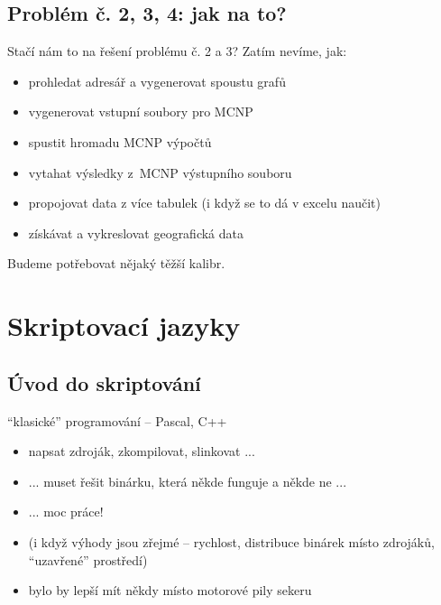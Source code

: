 \documentclass{beamer}
\begin{document}
\subsection{Problém č. 2, 3, 4: jak na to?}

\begin{frame}{Stačí nám to na řešení problému č. 2 a 3?}
  Zatím nevíme, jak:
  \begin{itemize}
    \item prohledat adresář a vygenerovat spoustu grafů
  \end{itemize}
  \begin{itemize}
    \item vygenerovat vstupní soubory pro MCNP
    \item spustit hromadu MCNP výpočtů
    \item vytahat výsledky z~MCNP výstupního souboru
  \end{itemize}
  \begin{itemize}
    \item propojovat data z více tabulek (i když se to dá v excelu naučit)
    \item získávat a vykreslovat geografická data
  \end{itemize}
  Budeme potřebovat nějaký těžší kalibr.
\end{frame}

\section{Skriptovací jazyky}

\subsection{Úvod do skriptování}

\begin{frame}{``klasické'' programování -- Pascal, C++}
  \begin{itemize}
    \item napsat zdroják, zkompilovat, slinkovat ...
    \item ... muset řešit binárku, která někde funguje a někde ne ...
    \item ... moc práce!
    \item (i když výhody jsou zřejmé -- rychlost, distribuce binárek místo zdrojáků, ``uzavřené'' prostředí)
    \item bylo by lepší mít někdy místo motorové pily sekeru
  \end{itemize}
\end{frame}
\end{document}
